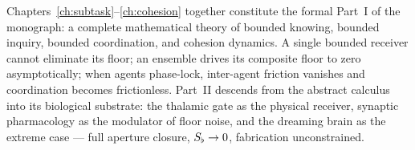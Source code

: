 Chapters~\ref{ch:subtask}--\ref{ch:cohesion} together constitute the formal
Part~I of the monograph: a complete mathematical theory of bounded knowing,
bounded inquiry, bounded coordination, and cohesion dynamics. A single
bounded receiver cannot eliminate its floor; an ensemble drives its composite
floor to zero asymptotically; when agents phase-lock, inter-agent friction
vanishes and coordination becomes frictionless. Part~II descends from the
abstract calculus into its biological substrate: the thalamic gate as the
physical receiver, synaptic pharmacology as the modulator of floor noise, and
the dreaming brain as the extreme case --- full aperture closure, $S_{\flat}\to 0$,
fabrication unconstrained.
